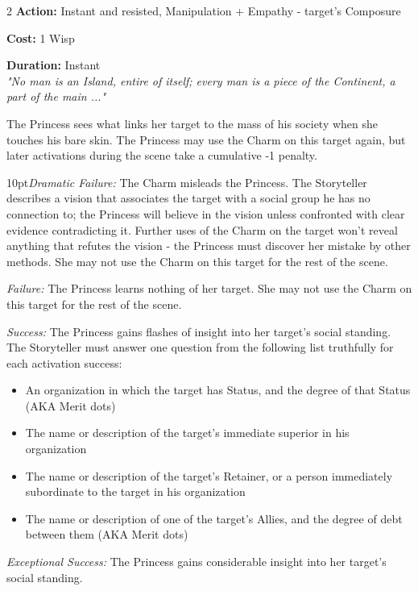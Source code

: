 \begin{multicols}{2}
\noindent \textbf{Action:} Instant and resisted, Manipulation + Empathy - target's Composure

\noindent \textbf{Cost:} 1 Wisp

\noindent \textbf{Duration:} Instant\\

\noindent \textit{"No man is an Island, entire of itself; every man is a piece of the Continent, a part of the main ..."}

The Princess sees what links her target to the mass of his society when she touches his bare skin. The Princess may use the Charm on this target again, but later activations during the scene take a cumulative -1 penalty.


\begin{myindentpar}{10pt}\emph{Dramatic Failure:} The Charm misleads the Princess. The Storyteller describes a vision that associates the target with a social group he has no connection to; the Princess will believe in the vision unless confronted with clear evidence contradicting it. Further uses of the Charm on the target won't reveal anything that refutes the vision - the Princess must discover her mistake by other methods. She may not use the Charm on this target for the rest of the scene.

\emph{Failure:} The Princess learns nothing of her target. She may not use the Charm on this target for the rest of the scene.

\emph{Success:} The Princess gains flashes of insight into her target's social standing. The Storyteller must answer one question from the following list truthfully for each activation success:

\begin{itemize}
\item An organization in which the target has Status, and the degree of that Status (AKA Merit dots)
\item The name or description of the target's immediate superior in his organization
\item The name or description of the target's Retainer, or a person immediately subordinate to the target in his organization
\item The name or description of one of the target's Allies, and the degree of debt between them (AKA Merit dots)
\end{itemize}


\emph{Exceptional Success:} The Princess gains considerable insight into her target's social standing.


\end{myindentpar}
\end{multicols}
